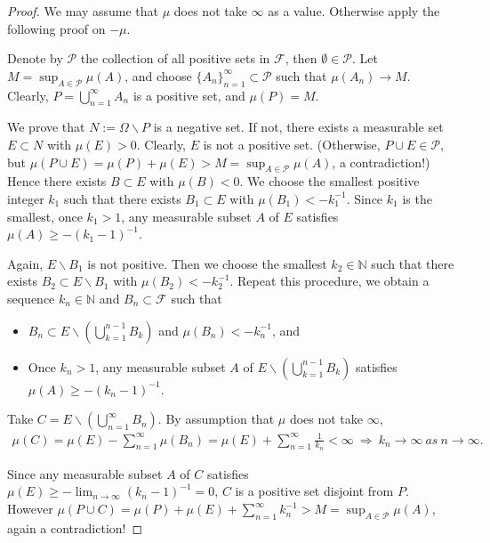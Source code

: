 \documentclass{article}
\numberwithin{equation}{section}
\theoremstyle{plain}
\theoremstyle{definition}
\begin{document}
\begin{proof}
	We may assume that $\mu$ does not take $\infty$ as a value. Otherwise apply the following proof on $-\mu$.
	
	Denote by $\mathscr{P}$ the collection of all positive sets in $\mathscr{F}$, then $\emptyset\in\mathscr{P}$. Let $M=\sup_{A\in\mathscr{P}}\mu(A)$, and choose $\{A_n\}_{n=1}^\infty\subset\mathscr{P}$ such that $\mu(A_n)\to M$. Clearly, $P=\bigcup_{n=1}^\infty A_n$ is a positive set, and $\mu(P)=M$. 
	
	We prove that $N:=\Omega\backslash P$ is a negative set. If not, there exists a measurable set $E\subset N$ with $\mu(E)>0$. Clearly, $E$ is not a positive set. (Otherwise, $P\cup E\in\mathscr{P}$, but $\mu(P\cup E)=\mu(P)+\mu(E)>M=\sup_{A\in\mathscr{P}}\mu(A)$, a contradiction!) Hence there exists $B\subset E$ with $\mu(B)<0$. We choose the smallest positive integer $k_1$ such that there exists $B_1\subset E$ with $\mu(B_1)<-k_1^{-1}$. Since $k_1$ is the smallest, once $k_1>1$, any measurable subset $A$ of $E$ satisfies $\mu(A)\geq-(k_1-1)^{-1}$.
	
	Again, $E\backslash B_1$ is not positive. Then we choose the smallest $k_2\in\mathbb{N}$ such that there exists $B_2\subset E\backslash B_1$ with $\mu(B_2)<-k_2^{-1}$. Repeat this procedure, we obtain a sequence $k_n\in\mathbb{N}$ and $B_n\subset\mathscr{F}$ such that 
	\begin{itemize}
		\vspace{0.1cm}
		\item $B_n\subset E\backslash\left(\bigcup_{k=1}^{n-1} B_k\right)$ and $\mu(B_n)<-k_n^{-1}$, and
		\item Once $k_n>1$, any measurable subset $A$ of $E\backslash\left(\bigcup_{k=1}^{n-1} B_k\right)$ satisfies $\mu(A)\geq-(k_n-1)^{-1}$.
	\end{itemize}
	
	Take $C=E\backslash\left(\bigcup_{n=1}^\infty B_n\right)$. By assumption that $\mu$ does not take $\infty$,
	\begin{align*}
		\mu(C) = \mu(E) - \sum_{n=1}^\infty\mu(B_n) = \mu(E) + \sum_{n=1}^\infty\frac{1}{k_n} < \infty\ \Rightarrow\ k_n\to\infty\ \textit{as}\ n\to\infty.
	\end{align*}

	Since any measurable subset $A$ of $C$ satisfies $\mu(E)\geq-\lim_{n\to\infty}(k_n-1)^{-1}=0$, $C$ is a positive set disjoint from $P$. However $\mu(P\cup C)=\mu(P)+\mu(E)+\sum_{n=1}^\infty k_n^{-1}>M=\sup_{A\in\mathscr{P}}\mu(A)$, again a contradiction!
\end{proof}
\end{document}
